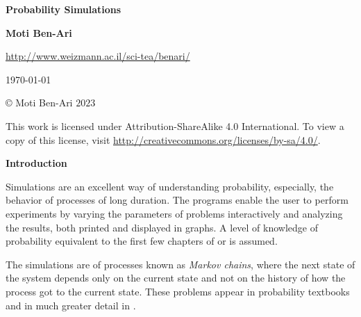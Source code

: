 

\thispagestyle{empty}

\begin{center}
\textbf{\LARGE Probability Simulations}

\bigskip
\bigskip
\bigskip

\textbf{\Large Moti Ben-Ari}

\bigskip

\url{http://www.weizmann.ac.il/sci-tea/benari/}

\bigskip
\bigskip
\bigskip

%

\today

\end{center}

\vfill

\begin{center}
\copyright{} Moti Ben-Ari $2023$
 \end{center}
 
\begin{small}
This work is licensed under Attribution-ShareAlike 4.0 International. To view a copy of this license, visit \url{http://creativecommons.org/licenses/by-sa/4.0/}.
\end{small}
\newpage

\tableofcontents

\newpage

\begin{center}
\textbf{\LARGE Introduction}
\end{center}


\bigskip

Simulations are an excellent way of understanding probability, especially, the behavior of processes of long duration. The programs enable the user to perform experiments by varying the parameters of problems interactively and analyzing the results, both printed and displayed in graphs. A level of knowledge of probability equivalent to the first few chapters of \cite{BW} or \cite{ross} is assumed.

The simulations are of processes known as \emph{Markov chains}, where the next state of the system depends only on the current state and not on the history of how the process got to the current state. These problems appear in probability textbooks \cite{BW, ross} and in much greater detail in \cite{mos, border, mosteller, privault}.

